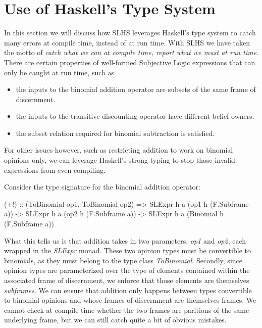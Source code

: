 \documentclass[thesis.tex]{subfiles}
\begin{document}
\section{Use of Haskell's Type System}

In this section we will discuss how SLHS leverages Haskell's type system to catch many errors
at compile time, instead of at run time. With SLHS we have taken the motto of \emph{catch what we
can at compile time, report what we must at run time}. There are certain properties of well-formed
Subjective Logic expressions that can only be caught at run time, such as

\begin{itemize}
  \item the inputs to the binomial addition operator are subsets of the same frame
    of discernment.
  \item the inputs to the transitive discounting operator have different belief
    owners.
  \item the subset relation required for binomial subtraction is satisfied.
\end{itemize}

For other issues however, such as restricting addition to work on binomial opinions only, we can
leverage Haskell's strong typing to stop those invalid expressions from even compiling.

Consider the type signature for the binomial addition operator:

\begin{spec}
(+!) :: (ToBinomial op1, ToBinomial op2)
       => SLExpr h a (op1 h (F.Subframe a))
       -> SLExpr h a (op2 h (F.Subframe a))
       -> SLExpr h a (Binomial h (F.Subframe a))
\end{spec}

What this tells us is that addition takes in two parameters, \emph{op1} and \emph{op2}, each wrapped in
the \emph{SLExpr} monad. These two opinion types must be convertible to binomials, as they must belong to
the type class \emph{ToBinomial}. Secondly, since opinion types are parameterized over the type of elements
contained within the associated frame of discernment, we enforce that those elements are themselves
\emph{subframes}. We can ensure that addition only happens between types convertible to binomial opinions
and whose frames of discernment are themselves frames. We cannot check at compile time whether the two
frames are paritions of the same underlying frame, but we can still catch quite a bit of obvious mistakes.
\end{document}

